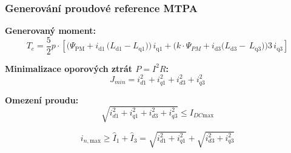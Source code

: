 \documentclass[%
  12pt,       				%
	t,                  %
	aspectratio=1610,   %
	unicode,						%
]{beamer}				    	%
\begin{document}
\begin{frame}
	\frametitle{Generování proudové reference MTPA }
	\textbf{Generovaný moment:}
		\begin{equation}
			\label{eq:moment 3rd}
			T_e = \frac{5}{2} p \cdot \left[
			\Big(\Psi _{\mathrm{PM}}+i_{\mathrm{d1}}\,\big(L_{\mathrm{d1}}-L_{\mathrm{q1}}\big)\Big)\,i_{\mathrm{q1}}+
			\Big( k\cdot \Psi_{PM}+ i_{\mathrm{d3}} \big(L_{\mathrm{d3}}-\,L_{\mathrm{q3}}\big)\Big)3\,i_{\mathrm{q3}}\right]
		\end{equation}

	\textbf{Minimalizace oporových ztrát $P=I^2 R$:}	
	\begin{equation}
		\label{eq:optimalni proud}
		J_{min} = i_{d1}^2 + i_{q1}^2 + i_{d3}^2 + i_{q3}^2
	\end{equation}

	\textbf{Omezení proudu:}
	\begin{equation}
		\label{eq:Idc max}
		\sqrt{i_{d1}^2 + i_{q1}^2 + i_{d3}^2 + i_{q3}^2} \leq I_{DC\text{max}}
	\end{equation}

	\begin{equation}
		\label{eq:isw max}
		i_{n,\text{max}} \geq \hat{I}_1 + \hat{I}_3 = \sqrt{i_{d1}^2 + i_{q1}^2} + \sqrt{i_{d3}^2 + i_{q3}^2}
	\end{equation}
\end{frame}
\end{document}
